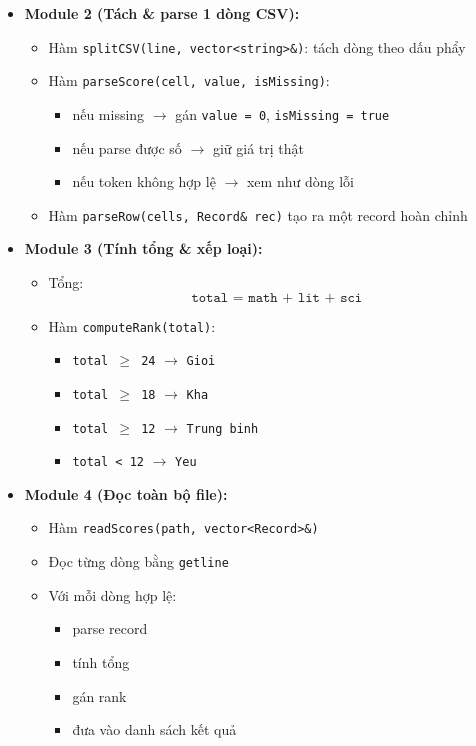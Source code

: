 \begin{itemize}
\begin{itemize}
        \item \textbf{Module 2 (Tách \& parse 1 dòng CSV):}
        \begin{itemize}
            \item Hàm \texttt{splitCSV(line, vector<string>\&)}: tách dòng theo dấu phẩy
            \item Hàm \texttt{parseScore(cell, value, isMissing)}:
            \begin{itemize}
                \item nếu missing $\rightarrow$ gán \texttt{value = 0}, \texttt{isMissing = true}
                \item nếu parse được số $\rightarrow$ giữ giá trị thật
                \item nếu token không hợp lệ $\rightarrow$ xem như dòng lỗi
            \end{itemize}
            \item Hàm \texttt{parseRow(cells, Record\& rec)} tạo ra một record hoàn chỉnh
        \end{itemize}

        \item \textbf{Module 3 (Tính tổng \& xếp loại):}
        \begin{itemize}
            \item Tổng:
            \[
                \texttt{total = math + lit + sci}
            \]
            \item Hàm \texttt{computeRank(total)}:
            \begin{itemize}
                \item \texttt{total $\geq$ 24} $\rightarrow$ \texttt{Gioi}
                \item \texttt{total $\geq$ 18} $\rightarrow$ \texttt{Kha}
                \item \texttt{total $\geq$ 12} $\rightarrow$ \texttt{Trung binh}
                \item \texttt{total < 12} $\rightarrow$ \texttt{Yeu}
            \end{itemize}
        \end{itemize}

        \item \textbf{Module 4 (Đọc toàn bộ file):}
        \begin{itemize}
            \item Hàm \texttt{readScores(path, vector<Record>\&)}
            \item Đọc từng dòng bằng \texttt{getline}
            \item Với mỗi dòng hợp lệ:
            \begin{itemize}
                \item parse record
                \item tính tổng
                \item gán rank
                \item đưa vào danh sách kết quả
            \end{itemize}
        \end{itemize}


\end{itemize}
\end{itemize}
